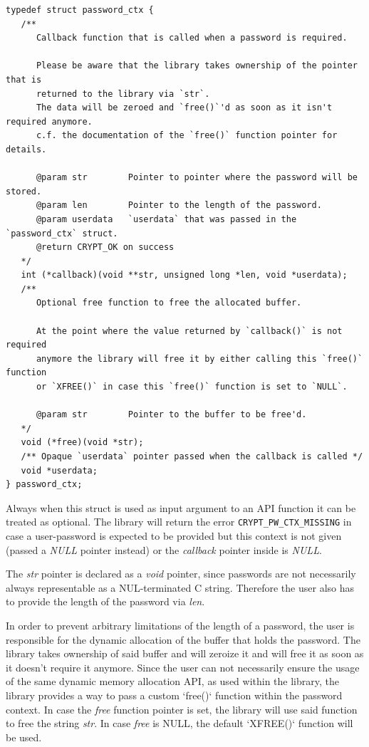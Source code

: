 \documentclass[synpaper]{book}
\begin{document}
\begin{verbatim}
typedef struct password_ctx {
   /**
      Callback function that is called when a password is required.

      Please be aware that the library takes ownership of the pointer that is
      returned to the library via `str`.
      The data will be zeroed and `free()`'d as soon as it isn't required anymore.
      c.f. the documentation of the `free()` function pointer for details.

      @param str        Pointer to pointer where the password will be stored.
      @param len        Pointer to the length of the password.
      @param userdata   `userdata` that was passed in the `password_ctx` struct.
      @return CRYPT_OK on success
   */
   int (*callback)(void **str, unsigned long *len, void *userdata);
   /**
      Optional free function to free the allocated buffer.

      At the point where the value returned by `callback()` is not required
      anymore the library will free it by either calling this `free()` function
      or `XFREE()` in case this `free()` function is set to `NULL`.

      @param str        Pointer to the buffer to be free'd.
   */
   void (*free)(void *str);
   /** Opaque `userdata` pointer passed when the callback is called */
   void *userdata;
} password_ctx;
\end{verbatim}

Always when this struct is used as input argument to an API function it can be treated as optional.
The library will return the error \texttt{CRYPT\_PW\_CTX\_MISSING} in case a user-password is expected
to be provided but this context is not given (passed a \textit{NULL} pointer instead) or
the \textit{callback} pointer inside is \textit{NULL}.

The \textit{str} pointer is declared as a \textit{void} pointer, since passwords are not necessarily
always representable as a NUL-terminated C string. Therefore the user also has to provide the length of the
password via \textit{len}.

In order to prevent arbitrary limitations of the length of a password, the user is responsible for the
dynamic allocation of the buffer that holds the password. The library takes ownership of said buffer
and will zeroize it and will free it as soon as it doesn't require it anymore.
Since the user can not necessarily ensure the usage of the same dynamic memory allocation API, as used
within the library, the library provides a way to pass a custom `free()` function within the password context.
In case the \textit{free} function pointer is set, the library will use said function to free
the string \textit{str}. In case \textit{free} is NULL, the default `XFREE()` function will be used.
\end{document}

